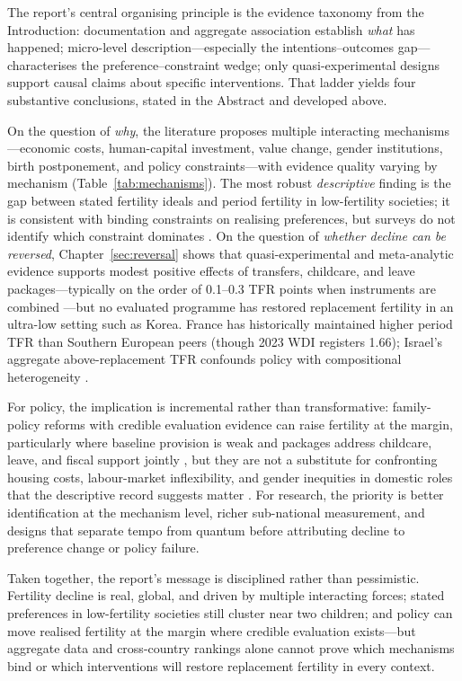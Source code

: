 \documentclass[11pt,a4paper,openany]{book}
\begin{document}
The report's central organising principle is the evidence taxonomy from the Introduction: documentation and aggregate association establish \emph{what} has happened; micro-level description---especially the intentions--outcomes gap---characterises the preference--constraint wedge; only quasi-experimental designs support causal claims about specific interventions. That ladder yields four substantive conclusions, stated in the Abstract and developed above.

On the question of \emph{why}, the literature proposes multiple interacting mechanisms---economic costs, human-capital investment, value change, gender institutions, birth postponement, and policy constraints---with evidence quality varying by mechanism (Table~\ref{tab:mechanisms}). The most robust \emph{descriptive} finding is the gap between stated fertility ideals and period fertility in low-fertility societies; it is consistent with binding constraints on realising preferences, but surveys do not identify which constraint dominates \citep{sobotka2017,doepke2023}. On the question of \emph{whether decline can be reversed}, Chapter~\ref{sec:reversal} shows that quasi-experimental and meta-analytic evidence supports modest positive effects of transfers, childcare, and leave packages---typically on the order of 0.1--0.3 TFR points when instruments are combined \citep{luci2013,gauthier2007,milligan2005}---but no evaluated programme has restored replacement fertility in an ultra-low setting such as Korea. France has historically maintained higher period TFR than Southern European peers (though 2023 WDI registers 1.66); Israel's aggregate above-replacement TFR confounds policy with compositional heterogeneity \citep{okun2013,hoem2008,jones2019}.

For policy, the implication is incremental rather than transformative: family-policy reforms with credible evaluation evidence can raise fertility at the margin, particularly where baseline provision is weak and packages address childcare, leave, and fiscal support jointly \citep{gauthier2007,thevenon2011,doepke2023}, but they are not a substitute for confronting housing costs, labour-market inflexibility, and gender inequities in domestic roles that the descriptive record suggests matter \citep{mcdonald2006,goldscheider2015}. For research, the priority is better identification at the mechanism level, richer sub-national measurement, and designs that separate tempo from quantum before attributing decline to preference change or policy failure.

Taken together, the report's message is disciplined rather than pessimistic. Fertility decline is real, global, and driven by multiple interacting forces; stated preferences in low-fertility societies still cluster near two children; and policy can move realised fertility at the margin where credible evaluation exists---but aggregate data and cross-country rankings alone cannot prove which mechanisms bind or which interventions will restore replacement fertility in every context.
\end{document}
